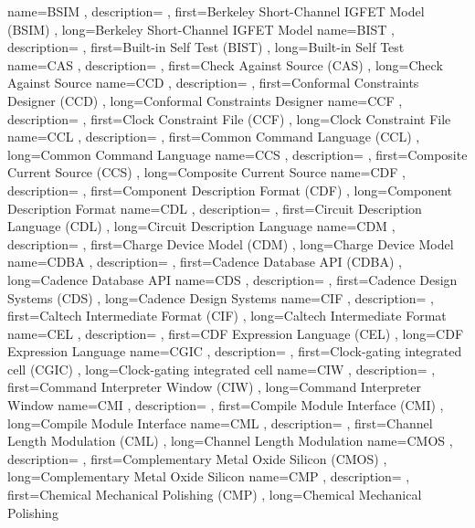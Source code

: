 { name={BSIM}
, description={}
, first={Berkeley Short-Channel IGFET Model (BSIM)}
, long={Berkeley Short-Channel IGFET Model}
}
{ name={BIST}
, description={}
, first={Built-in Self Test (BIST)}
, long={Built-in Self Test}
}
{ name={CAS}
, description={}
, first={Check Against Source (CAS)}
, long={Check Against Source}
}
{ name={CCD}
, description={}
, first={Conformal Constraints Designer (CCD)}
, long={Conformal Constraints Designer}
}
{ name={CCF}
, description={}
, first={Clock Constraint File (CCF)}
, long={Clock Constraint File}
}
{ name={CCL}
, description={}
, first={Common Command Language (CCL)}
, long={Common Command Language}
}
{ name={CCS}
, description={}
, first={Composite Current Source (CCS)}
, long={Composite Current Source}
}
{ name={CDF}
, description={}
, first={Component Description Format (CDF)}
, long={Component Description Format}
}
{ name={CDL}
, description={}
, first={Circuit Description Language (CDL)}
, long={Circuit Description Language}
}
{ name={CDM}
, description={}
, first={Charge Device Model (CDM)}
, long={Charge Device Model}
}
{ name={CDBA}
, description={}
, first={Cadence Database API (CDBA)}
, long={Cadence Database API}
}
{ name={CDS}
, description={}
, first={Cadence Design Systems (CDS)}
, long={Cadence Design Systems}
}
{ name={CIF}
, description={}
, first={Caltech Intermediate Format (CIF)}
, long={Caltech Intermediate Format}
}
{ name={CEL}
, description={}
, first={CDF Expression Language (CEL)}
, long={CDF Expression Language}
}
{ name={CGIC}
, description={}
, first={Clock-gating integrated cell (CGIC)}
, long={Clock-gating integrated cell}
}
{ name={CIW}
, description={}
, first={Command Interpreter Window (CIW)}
, long={Command Interpreter Window}
}
{ name={CMI}
, description={}
, first={Compile Module Interface (CMI)}
, long={Compile Module Interface}
}
{ name={CML}
, description={}
, first={Channel Length Modulation (CML)}
, long={Channel Length Modulation}
}
{ name={CMOS}
, description={}
, first={Complementary Metal Oxide Silicon (CMOS)}
, long={Complementary Metal Oxide Silicon}
}
{ name={CMP}
, description={}
, first={Chemical Mechanical Polishing (CMP)}
, long={Chemical Mechanical Polishing}
}
